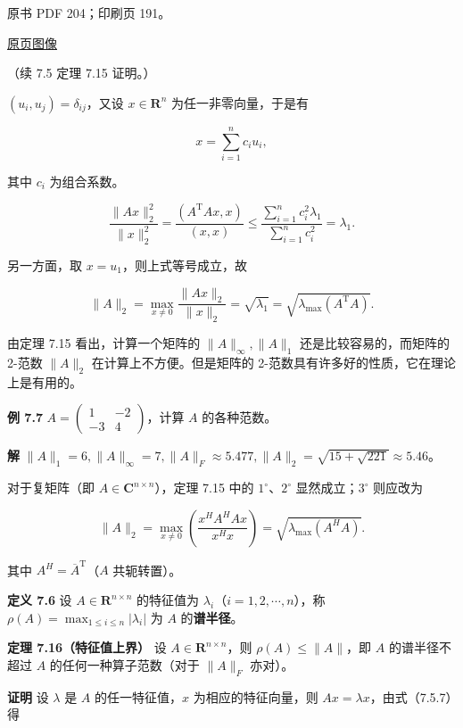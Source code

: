 \documentclass[
  10pt,
  fontset=fandol]{ctexart}
\begin{document}
\clearpage

原书 PDF 204；印刷页 191。

\href{/Users/xiangjunfeng/Desktop/数值计算专用/numerical-analysis/book/source-images/pdf-204.jpeg}{原页图像}

（续 7.5 定理 7.15 证明。）

\((u_i,u_j)=\delta_{ij}\)，又设 \(x\in\mathbf R^n\)
为任一非零向量，于是有

\[
x=\sum_{i=1}^{n}c_iu_i,
\]

其中 \(c_i\) 为组合系数。

\[
\frac{\|Ax\|_2^2}{\|x\|_2^2}
=\frac{(A^{\mathrm T}Ax,x)}{(x,x)}
\leqslant\frac{\sum_{i=1}^{n}c_i^2\lambda_1}{\sum_{i=1}^{n}c_i^2}=\lambda_1.
\]

另一方面，取 \(x=u_1\)，则上式等号成立，故

\[
\|A\|_2=\max_{x\neq0}\frac{\|Ax\|_2}{\|x\|_2}=\sqrt{\lambda_1}=\sqrt{\lambda_{\max}(A^{\mathrm T}A)}.
\]

由定理 7.15 看出，计算一个矩阵的 \(\|A\|_\infty,\|A\|_1\)
还是比较容易的，而矩阵的 2-范数 \(\|A\|_2\) 在计算上不方便。但是矩阵的
2-范数具有许多好的性质，它在理论上是有用的。

\textbf{例 7.7} \(A=\begin{pmatrix}1&-2\\-3&4\end{pmatrix}\)，计算 \(A\)
的各种范数。

\textbf{解}
\(\|A\|_1=6,\|A\|_\infty=7,\|A\|_F\approx5.477,\|A\|_2=\sqrt{15+\sqrt{221}}\approx5.46\)。

对于复矩阵（即 \(A\in\mathbf C^{n\times n}\)），定理 7.15 中的
\(1^\circ\)、\(2^\circ\) 显然成立；\(3^\circ\) 则应改为

\[
\|A\|_2=\max_{x\neq0}\left(\frac{x^HA^HAx}{x^Hx}\right)=\sqrt{\lambda_{\max}(A^HA)}.
\]

其中 \(A^H=\overline A^{\mathrm T}\)（\(A\) 共轭转置）。

\textbf{定义 7.6} 设 \(A\in\mathbf R^{n\times n}\) 的特征值为
\(\lambda_i\)（\(i=1,2,\cdots,n\)），称
\(\rho(A)=\max_{1\leqslant i\leqslant n}|\lambda_i|\) 为 \(A\)
的\textbf{谱半径}。

\textbf{定理 7.16（特征值上界）} 设 \(A\in\mathbf R^{n\times n}\)，则
\(\rho(A)\leqslant\|A\|\)，即 \(A\) 的谱半径不超过 \(A\)
的任何一种算子范数（对于 \(\|A\|_F\) 亦对）。

\textbf{证明} 设 \(\lambda\) 是 \(A\) 的任一特征值，\(x\)
为相应的特征向量，则 \(Ax=\lambda x\)，由式（7.5.7）得
\end{document}
